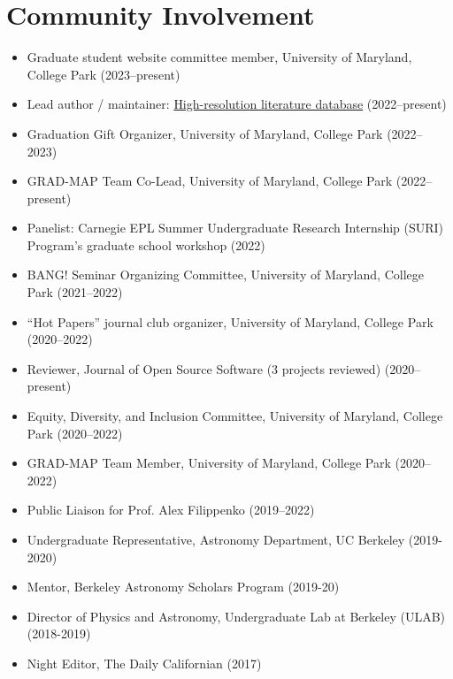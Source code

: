 \documentclass[letterpaper,10.5pt]{article}
\newcommand{\resumeItem}[2]{
  \item\small{
    \textbf{#1}{#2 \vspace{-2pt}}
  }
}
\newcommand{\resumeItemListStart}{\begin{itemize}}
\newcommand{\resumeItemListEnd}{\end{itemize}\vspace{-5pt}}
\newcommand{\shorterSection}[1]{\vspace{-10pt}\section{#1}}
\begin{document}
\vspace{-6pt}
\shorterSection{Community Involvement}
\resumeItemListStart
\resumeItem{}{Graduate student website committee member, University of Maryland, College Park (2023--present)}
\resumeItem{}{Lead author / maintainer: \href{https://www.arjunsavel.com/hires_papers.html}{High-resolution literature database} (2022--present)}
\resumeItem{}{Graduation Gift Organizer, University of Maryland, College Park (2022--2023)}
\resumeItem{}{GRAD-MAP Team Co-Lead, University of Maryland, College Park (2022--present)}
\resumeItem{}{Panelist: Carnegie EPL Summer Undergraduate Research Internship (SURI) Program’s graduate school workshop (2022)}
\resumeItem{}{BANG! Seminar Organizing Committee, University of Maryland, College Park (2021--2022)}
\resumeItem{}{``Hot Papers'' journal club organizer, University of Maryland, College Park (2020--2022)}
\resumeItem{}{Reviewer, Journal of Open Source Software (3 projects reviewed) (2020--present)}
\resumeItem{}{Equity, Diversity, and Inclusion Committee, University of Maryland, College Park (2020--2022)}
\resumeItem{}{GRAD-MAP Team Member, University of Maryland, College Park (2020--2022)}
\resumeItem{}{Public Liaison for Prof. Alex Filippenko (2019--2022)}
\resumeItem{}{Undergraduate Representative, Astronomy Department, UC Berkeley (2019-2020)}
\resumeItem{}{Mentor, Berkeley Astronomy Scholars Program (2019-20)}
\resumeItem{}{Director of Physics and Astronomy, Undergraduate Lab at Berkeley (ULAB) (2018-2019)}
\resumeItem{}{Night Editor, The Daily Californian (2017)}
\resumeItemListEnd


\end{document}
